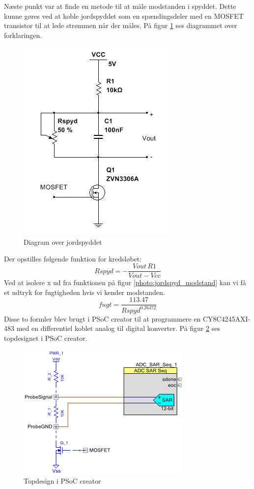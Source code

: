Næste punkt var at finde en metode til at måle modstanden i spyddet. Dette kunne gøres ved at koble jordspyddet som en spændingsdeler med en MOSFET transistor til at lede strømmen når der måles. På figur \ref{photo:jordspyd_diagram} ses diagrammet over forklaringen. 
 
\begin{figure}[H]
	\centering 
	\includegraphics[scale=0.8]{HardwareArkitektur/Sensore/Jordfugt_billeder/jordspyd.JPG}
	\caption{Diagram over jordspyddet}
	\label{photo:jordspyd_diagram}
\end{figure} 

Der opstilles følgende funktion for kredsløbet:
$$Rspyd=-{\frac {{Vout}\,{R1}}{{Vout}-{Vcc}}}$$
Ved at isolere x ud fra funktionen på figur \ref{photo:jordspyd_modstand} kan vi få et udtryk for fugtigheden hvis vi kender modstanden. 
$$fugt=\frac{113.47}{Rspyd^{0.26472}}$$
Disse to formler blev brugt i PSoC creator til at programmere en CY8C4245AXI-483 med en differentiel koblet analog til digital konverter. På figur \ref{photo:ADC} ses topdesignet i PSoC creator.    

\begin{figure}[H]
	\centering 
	\includegraphics[scale=0.8]{HardwareArkitektur/Sensore/Jordfugt_billeder/SAR_converter.png}
	\caption{Topdesign i PSoC creator}
	\label{photo:ADC}
\end{figure} 

